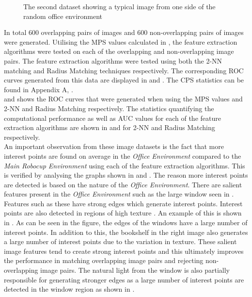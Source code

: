 \documentclass[11pt]{report}
\begin{document}
\begin{figure}[h!]
\begin{minipage}[b]{0.5\linewidth}
\caption{The second dataset showing a typical image from one side of the random office environment}
\label{fig:dataset6}
\end{minipage}
\end{figure}

In total $600$ overlapping pairs of images and $600$ non-overlapping pairs of images were generated. Utilising the MPS values calculated in , the feature extraction algorithms were tested on each of the overlapping and non-overlapping image pairs. The feature extraction algorithms were tested using both the 2-NN matching and Radius Matching techniques respectively. The corresponding ROC curves generated from this data are displayed in  and . The CPS statistics can be found in Appendix A, . \\

 and  shows the ROC curves that were generated when using the MPS values and 2-NN and Radius Matching respectively. The statistics quantifying the computational performance as well as AUC values for each of the feature extraction algorithms are shown in  and  for 2-NN and Radius Matching respectively. \\

An important observation from these image datasets is the fact that more interest points are found on average in the \textit{Office Environment} compared to the \textit{Main Robocup Environment} using each of the feature extraction algorithms. This is verified by analysing the graphs shown in  and . The reason more interest points are detected is based on the nature of the \textit{Office Environment}. There are salient features present in the \textit{Office Environment} such as the large window seen in . Features such as these have strong edges which generate interest points. Interest points are also detected in regions of high texture \cite{Szeliski2010}. An example of this is shown in . As can be seen in the figure, the edges of the windows have a large number of interest points. In addition to this, the bookshelf  in the right image also generates a large number of interest points due to the variation in texture. These salient image features tend to create strong interest points and this ultimately improves the performance in matching overlapping image pairs and rejecting non-overlapping image pairs. The natural light from the window is also partially responsible for generating stronger edges as a large number of interest points are detected in the window region as shown in . \\
\end{document}

